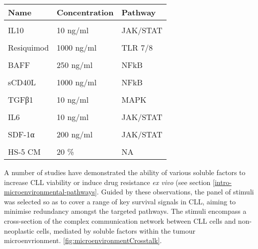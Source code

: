 \documentclass[11pt, a4paper, twosided]{book}
\begin{document}
\begin{table}
\centering\begingroup\fontsize{7}{9}\selectfont
\begin{tabular}{l|l|l}
\hline
\textbf{Name} & \textbf{Concentration} & \textbf{Pathway}\\
\hline
\cellcolor[HTML]{E2E868}{IL4} & \cellcolor[HTML]{E2E868}{10 ng/ml} & \cellcolor[HTML]{E2E868}{JAK/STAT}\\
\hline
IL10 & 10 ng/ml & JAK/STAT\\
\hline
\cellcolor[HTML]{E2E868}{IL2} & \cellcolor[HTML]{E2E868}{10 ng/ml} & \cellcolor[HTML]{E2E868}{JAK/STAT}\\
\hline
Resiquimod & 1000 ng/ml & TLR 7/8\\
\hline
\cellcolor[HTML]{E2E868}{IL21} & \cellcolor[HTML]{E2E868}{10 ng/ml} & \cellcolor[HTML]{E2E868}{JAK/STAT}\\
\hline
BAFF & 250 ng/ml & NFkB\\
\hline
\cellcolor[HTML]{E2E868}{IL1β} & \cellcolor[HTML]{E2E868}{10 ng/ml} & \cellcolor[HTML]{E2E868}{NFkB}\\
\hline
sCD40L & 1000 ng/ml & NFkB\\
\hline
\cellcolor[HTML]{E2E868}{soluble anti-IgM} & \cellcolor[HTML]{E2E868}{20000 ng/ml} & \cellcolor[HTML]{E2E868}{BCR}\\
\hline
TGFβ1 & 10 ng/ml & MAPK\\
\hline
\cellcolor[HTML]{E2E868}{IL15} & \cellcolor[HTML]{E2E868}{10 ng/ml} & \cellcolor[HTML]{E2E868}{JAK/STAT}\\
\hline
IL6 & 10 ng/ml & JAK/STAT\\
\hline
\cellcolor[HTML]{E2E868}{CpG ODN} & \cellcolor[HTML]{E2E868}{1000 ng/ml} & \cellcolor[HTML]{E2E868}{TLR 9}\\
\hline
SDF-1α & 200 ng/ml & JAK/STAT\\
\hline
\cellcolor[HTML]{E2E868}{Interferon γ} & \cellcolor[HTML]{E2E868}{5 ng/ml} & \cellcolor[HTML]{E2E868}{NFkB}\\
\hline
HS-5 CM & 20 \% & NA\\
\hline
\end{tabular}
\endgroup{}
\end{table}
A number of studies have demonstrated the ability of various soluble factors to increase CLL viability or induce drug resistance \emph{ex vivo} (see section \ref{intro-microenvironmental-pathways}. Guided by these observations, the panel of stimuli was selected so as to cover a range of key survival signals in CLL, aiming to minimise redundancy amongst the targeted pathways. The stimuli encompass a cross-section of the complex communication network between CLL cells and non-neoplastic cells, mediated by soluble factors within the tumour microenvrionment. \ref{fig:microenvironmentCrosstalk}.
\end{document}
